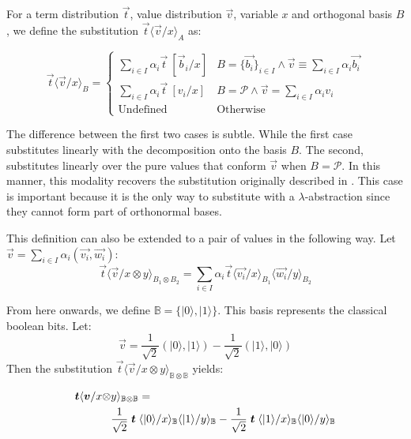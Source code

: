\documentclass[runningheads,orivec]{llncs}
\newcommand\ket[1]{\ensuremath{|#1\rangle}}
\newcommand\ansubst[2]{\ensuremath{\langle #1 \rangle_{#2}}}
\newcommand\AbsBasis{\ensuremath{\mathcal{P}}}
\def\Pair#1#2{(#1,#2)} %
\newcommand\B{\mathbb B}
\begin{document}
\begin{definition}
  For a term distribution $\vec{t}$, value distribution $\vec{v}$, variable $x$ and orthogonal basis $B$, we define the substitution $\vec{t}\ansubst{\vec{v}/x}{A}$ as:
  
  \[
  \vec{t}\ansubst{\vec{v}/x}{B} = 
    \begin{cases}
      \sum_{i\in I} \alpha_i \vec t\ [\vec b_i / x] 
      & B=\{\vec{b_i}\}_{i\in I}\wedge\vec{v}\equiv\sum\limits_{i\in I} \alpha_i \vec{b_i} \\
      \sum_{i\in I}\alpha_i\vec{t}\ [v_i/x] & B = \AbsBasis\wedge\vec{v}=\sum\limits_{i\in I}\alpha_i v_i\\
      \text{Undefined} & \text{Otherwise}
    \end{cases}
  \]
  
  The difference between the first two cases is subtle. While the first case substitutes linearly with the decomposition onto the basis $B$. The second, substitutes linearly over the pure values that conform $\vec{v}$ when $B=\AbsBasis$. In this manner, this modality recovers the substitution originally described in \cite{DiazcaroGuillermoMiquelValironLICS19}. This case is important because it is the only way to substitute with a $\lambda$-abstraction since they cannot form part of orthonormal bases. 

  This definition can also be extended to a pair of values in the following way. Let $\vec v = \sum_{i\in I} \alpha_i \Pair{\vec{v_i}}{\vec{w_i}}$:
  \[
    \vec t\ansubst{\vec{v}/x\otimes y}{B_1 \otimes B_2} = \sum_{i\in I} \alpha_i \vec t\ansubst{\vec{v_i}/x}{B_1}\ansubst{\vec{w_i}/y}{B_2}
  \]
\end{definition}

\begin{example}
From here onwards, we define $\B = \{\ket{0}, \ket{1}\}$. This basis represents the classical boolean bits. Let: 
\[\vec{v}= \frac{1}{\sqrt{2}} \Pair{\ket{0}}{\ket{1}} - \frac{1}{\sqrt{2}}\Pair{\ket{1}}{\ket{0}}\]
Then the substitution $\vec{t}\ansubst{\vec{v}/x\otimes y}{\B\otimes\B}$ yields:

\begin{align*}
\vec{t}\ansubst{\vec{v}/x\otimes &y}{\B\otimes\B} = \\ 
&\frac{1}{\sqrt{2}}\;\vec{t}\;\ansubst{\ket{0}/x}{\B}\ansubst{\ket{1}/y}{\B} - \frac{1}{\sqrt{2}}\;\vec{t}\;\ansubst{\ket{1}/x}{\B}\ansubst{\ket{0}/y}{\B}
\end{align*}

\end{example}
\end{document}
